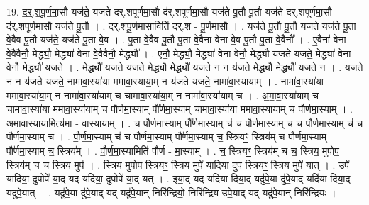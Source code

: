 \documentclass[17pt]{extarticle}
\begin{document}
19. द॒र्॒.श॒पू॒र्ण॒मा॒सौ यज॑ते॒ यज॑ते दर्.शपूर्णमा॒सौ द॑र्.शपूर्णमा॒सौ यज॑ते पू॒तौ पू॒तौ यज॑ते दर्.शपूर्णमा॒सौ द॑र्.शपूर्णमा॒सौ यज॑ते पू॒तौ । . द॒र्॒.श॒पू॒र्ण॒मा॒साविति॑ दर्.श - पू॒र्ण॒मा॒सौ । . यज॑ते पू॒तौ पू॒तौ यज॑ते॒ यज॑ते पू॒ता वे॒वैव पू॒तौ यज॑ते॒ यज॑ते पू॒ता वे॒व । . पू॒ता वे॒वैव पू॒तौ पू॒ता वे॒वैना॑ वेना वे॒व पू॒तौ पू॒ता वे॒वैनौ᳚ । . ए॒वैना॑ वेना वे॒वैवैनौ॒ मेद्ध्यौ॒ मेद्ध्या॑ वेना वे॒वैवैनौ॒ मेद्ध्यौ᳚ । . ए॒नौ॒ मेद्ध्यौ॒ मेद्ध्या॑ वेना वेनौ॒ मेद्ध्यौ॑ यजते यजते॒ मेद्ध्या॑ वेना वेनौ॒ मेद्ध्यौ॑ यजते । . मेद्ध्यौ॑ यजते यजते॒ मेद्ध्यौ॒ मेद्ध्यौ॑ यजते॒ न न य॑जते॒ मेद्ध्यौ॒ मेद्ध्यौ॑ यजते॒ न । . य॒ज॒ते॒ न न य॑जते यजते॒ नामा॑वा॒स्या॑या ममावा॒स्या॑या॒म् न य॑जते यजते॒ नामा॑वा॒स्या॑याम् । . नामा॑वा॒स्या॑या ममावा॒स्या॑या॒म् न नामा॑वा॒स्या॑याम् च चामावा॒स्या॑या॒म् न नामा॑वा॒स्या॑याम् च । . अ॒मा॒वा॒स्या॑याम् च चामावा॒स्या॑या ममावा॒स्या॑याम् च पौर्णमा॒स्याम् पौ᳚र्णमा॒स्याम् चा॑मावा॒स्या॑या ममावा॒स्या॑याम् च पौर्णमा॒स्याम् । . अ॒मा॒वा॒स्या॑या॒मित्य॑मा - वा॒स्या॑याम् । . च॒ पौ॒र्ण॒मा॒स्याम् पौ᳚र्णमा॒स्याम् च॑ च पौर्णमा॒स्याम् च॑ च पौर्णमा॒स्याम् च॑ च पौर्णमा॒स्याम् च॑ । . पौ॒र्ण॒मा॒स्याम् च॑ च पौर्णमा॒स्याम् पौ᳚र्णमा॒स्याम् च॒ स्त्रियꣳ॒॒ स्त्रिय॑म् च पौर्णमा॒स्याम् पौ᳚र्णमा॒स्याम् च॒ स्त्रिय᳚म् । . पौ॒र्ण॒मा॒स्यामिति॑ पौर्ण - मा॒स्याम् । . च॒ स्त्रियꣳ॒॒ स्त्रिय॑म् च च॒ स्त्रिय॒ मुपोप॒ स्त्रिय॑म् च च॒ स्त्रिय॒ मुप॑ । . स्त्रिय॒ मुपोप॒ स्त्रियꣳ॒॒ स्त्रिय॒ मुपे॑ यादिया॒ दुप॒ स्त्रियꣳ॒॒ स्त्रिय॒ मुपे॑ यात् । . उपे॑ यादिया॒ दुपोपे॑ या॒द् यद् यदि॑या॒ दुपोपे॑ या॒द् यत् । . इ॒या॒द् यद् यदि॑या दिया॒द् यदु॑पे॒या दु॑पे॒याद् यदि॑या दिया॒द् यदु॑पे॒यात् । . यदु॑पे॒या दु॑पे॒याद् यद् यदु॑पे॒यान् निरि॑न्द्रियो॒ निरि॑न्द्रिय उपे॒याद् यद् यदु॑पे॒यान् निरि॑न्द्रियः । \newline
\end{document}
